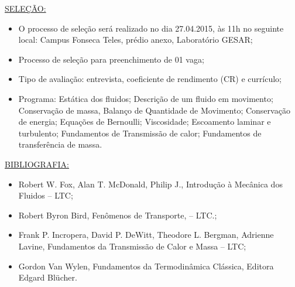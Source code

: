 \documentclass[a4paper,portuguese,12pt]{article}
\begin{document}
\vspace{1cm}

\underline{SELEÇÃO:}
\begin{itemize}
	\item O processo de seleção será realizado no dia 27.04.2015, às
	11h no seguinte local: Campus Fonseca Teles, prédio anexo, Laboratório
	GESAR;
	\item Processo de seleção para preenchimento de 01 vaga;
	\item Tipo de avaliação: entrevista, coeficiente de rendimento (CR)
	e currículo;
	\item Programa: Estática dos fluidos; Descrição de um fluido em
	movimento; Conservação de massa, Balanço de Quantidade de Movimento;
	Conservação de energia; Equações de Bernoulli; Viscosidade;
	Escoamento laminar e turbulento; Fundamentos de Transmissão de
	calor; Fundamentos de transferência de massa.
\end{itemize}

\vspace{1cm}

\underline{BIBLIOGRAFIA:}
\begin{itemize}
	\item Robert W. Fox, Alan T. McDonald, Philip J., Introdução à
	Mecânica dos Fluidos -- LTC;
	\item Robert Byron Bird, Fenômenos de Transporte, -- LTC.;
	\item Frank P. Incropera, David P. DeWitt, Theodore L. Bergman,
	Adrienne Lavine, Fundamentos da Transmissão de Calor e Massa -- LTC;
	\item Gordon Van Wylen, Fundamentos da Termodinâmica Clássica,
	Editora Edgard Blücher.
\end{itemize}
\end{document}
